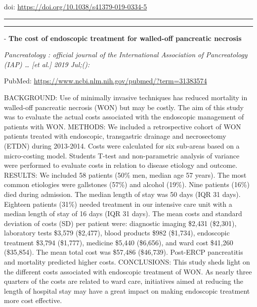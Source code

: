 \documentclass[]{article}
\begin{document}
doi: \url{https://doi.org/10.1038/s41379-019-0334-5}

{}

{}

\begin{center}\rule{0.5\linewidth}{\linethickness}\end{center}

\begin{center}\rule{0.5\linewidth}{\linethickness}\end{center}

 - \textbf{The cost of endoscopic treatment for walled-off pancreatic
necrosis}

\emph{Pancreatology : official journal of the International Association
of Pancreatology (IAP) \ldots{} {[}et al.{]} 2019 Jul;():}

PubMed: \url{https://www.ncbi.nlm.nih.gov/pubmed/?term=31383574}

BACKGROUND: Use of minimally invasive techniques has reduced mortality
in walled-off pancreatic necrosis (WON) but may be costly. The aim of
this study was to evaluate the actual costs associated with the
endoscopic management of patients with WON. METHODS: We included a
retrospective cohort of WON patients treated with endoscopic,
transgastric drainage and necrosectomy (ETDN) during 2013-2014. Costs
were calculated for six sub-areas based on a micro-costing model.
Students T-test and non-parametric analysis of variance were performed
to evaluate costs in relation to disease etiology and outcome. RESULTS:
We included 58 patients (50\% men, median age 57 years). The most common
etiologies were gallstones (57\%) and alcohol (19\%). Nine patients
(16\%) died during admission. The median length of stay was 50 days (IQR
31 days). Eighteen patients (31\%) needed treatment in our intensive
care unit with a median length of stay of 16 days (IQR 31 days). The
mean costs and standard deviation of costs (SD) per patient were:
diagnostic imaging \$2,431 (\$2,301), laboratory tests \$3,579
(\$2,477), blood products \$982 (\$1,734), endoscopic treatment \$3,794
(\$1,777), medicine \$5,440 (\$6,656), and ward cost \$41,260
(\$35,854). The mean total cost was \$57,486 (\$46,739). Post-ERCP
pancreatitis and mortality predicted higher costs. CONCLUSIONS: This
study sheds light on the different costs associated with endoscopic
treatment of WON. As nearly three quarters of the costs are related to
ward care, initiatives aimed at reducing the length of hospital stay may
have a great impact on making endoscopic treatment more cost effective.
\end{document}
